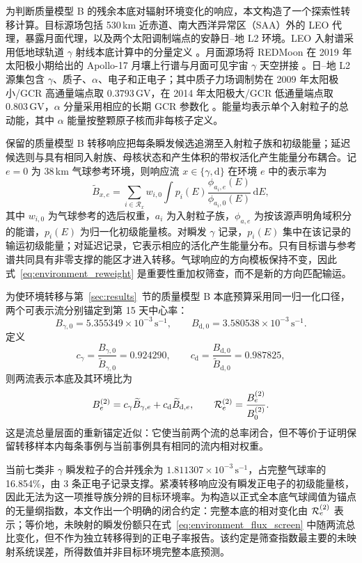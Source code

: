 \documentclass[11pt]{article}
\newcommand{\revblue}[1]{\textcolor{revisionblue}{#1}}
\newcommand{\cps}{\,\mathrm{s^{-1}}}
\begin{document}
为判断质量模型 B 的残余本底对辐射环境变化的响应，本文构造了一个探索性转移计算。目标源场包括 530\,km 近赤道、南大西洋异常区（SAA）外的 LEO 代理，暴露月面代理，以及两个太阳调制端点的安静日--地 L2 环境。LEO 入射谱采用低地球轨道 $\gamma$ 射线本底计算中的分量定义 \cite{Cumani2019LEO}。月面源场将 REDMoon 在 2019 年太阳极小期给出的 Apollo-17 月壤上行谱与月面可见宇宙 $\gamma$ 天空拼接 \cite{Dobynde2021REDMoon}。日--地 L2 源集包含 $\gamma$、质子、$\alpha$、电子和正电子；其中质子力场调制势在 2009 年太阳极小/GCR 高通量端点取 $0.3793$\,GV，在 2014 年太阳极大/GCR 低通量端点取 $0.803$\,GV，$\alpha$ 分量采用相应的长期 GCR 参数化 \cite{Lotti2021Athena,Usoskin2005,Kuznetsov2017}。能量均表示单个入射粒子的总动能，其中 $\alpha$ 能量按整颗原子核而非每核子定义。

保留的质量模型 B 转移响应把每条瞬发候选追溯至入射粒子族和初级能量；延迟候选则与具有相同入射族、母核状态和产生体积的带权活化产生能量分布耦合。记 $e=0$ 为 38\,km 气球参考环境，则响应流 $x\in\{\gamma,\mathrm d\}$ 在环境 $e$ 中的表示率为
\begin{equation}
 \widetilde B_{x,e}=
 \sum_{i\in\mathcal R_x}w_{i,0}
 \int p_i(E)
 \frac{\phi_{a_i,e}(E)}{\phi_{a_i,0}(E)}
 \,\mathrm dE ,
 \label{eq:environment_reweight}
\end{equation}
其中 $w_{i,0}$ 为气球参考的选后权重，$a_i$ 为入射粒子族，$\phi_{a,e}$ 为按该源声明角域积分的能谱，$p_i(E)$ 为归一化初级能量核。对瞬发 $\gamma$ 记录，$p_i(E)$ 集中在该记录的输运初级能量；对延迟记录，它表示相应的活化产生能量分布。只有目标谱与参考谱共同具有非零支撑的能区才进入转移。气球响应的方向模板保持不变，因此式~\eqref{eq:environment_reweight} 是重要性重加权筛查，而不是新的方向匹配输运。

为使环境转移与第~\ref{sec:results}~节的质量模型 B 本底预算采用同一归一化口径，两个可表示流分别锚定到第 15 天中心率：
\[
 B_{\gamma,0}=5.355349\times10^{-3}\cps,\qquad
 B_{\mathrm d,0}=3.580538\times10^{-3}\cps .
\]
定义
\[
 c_\gamma=\frac{B_{\gamma,0}}{\widetilde B_{\gamma,0}}=0.924290,
 \qquad
 c_{\mathrm d}=\frac{B_{\mathrm d,0}}{\widetilde B_{\mathrm d,0}}=0.987825,
\]
则两流表示本底及其环境比为
\begin{equation}
 B^{(2)}_e=c_\gamma\widetilde B_{\gamma,e}
          +c_{\mathrm d}\widetilde B_{\mathrm d,e},
 \qquad
 {\cal R}^{(2)}_e=\frac{B^{(2)}_e}{B^{(2)}_0}.
 \label{eq:environment_two_stream}
\end{equation}
这是流总量层面的重新锚定近似：它使当前两个流的总率闭合，但不等价于证明保留转移样本内每条事例与当前事例具有相同的流内相对权重。

当前\revblue{七类非 $\gamma$ 瞬发粒子的合并残余}为 $1.811307\times10^{-3}\cps$，占完整气球率的 16.854\%，由 3 条正电子记录支撑。紧凑转移响应没有瞬发正电子的初级能量核，因此无法为这一项推导族分辨的目标环境率。为构造以正式全本底气球阈值为锚点的无量纲指数，本文作出一个明确的闭合约定：完整本底的相对变化由 $ {\cal R}^{(2)}_e$ 表示；等价地，未映射的瞬发份额只在式~\eqref{eq:environment_flux_screen} 中随两流总比变化，但不作为独立转移得到的正电子率报告。该约定是筛查指数最主要的未映射系统误差，所得数值并非目标环境完整本底预测。
\end{document}
